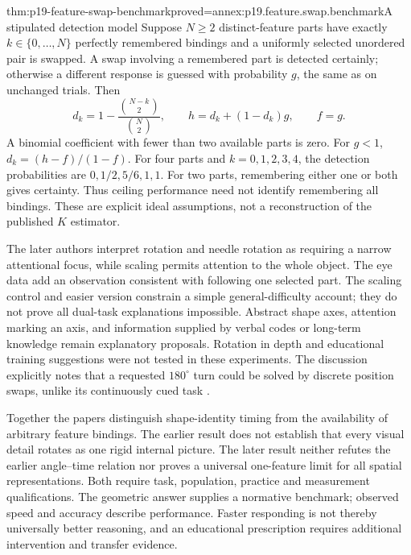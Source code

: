 \begin{hbtheorem}{thm:p19-feature-swap-benchmark}{proved=annex:p19.feature.swap.benchmark}{A stipulated detection model}
Suppose \(N\geq2\) distinct-feature parts have exactly
\(k\in\{0,\ldots,N\}\)
perfectly remembered bindings and a uniformly selected
unordered pair is swapped. A swap involving a remembered
part is detected certainly; otherwise a different response
is guessed with probability \(g\), the same as on unchanged trials.
Then
\[
 d_k=1-\frac{\binom{N-k}{2}}{\binom N2},\qquad
 h=d_k+(1-d_k)g,\qquad f=g.
\]
A binomial coefficient with fewer than two available parts
is zero. For \(g<1\), \(d_k=(h-f)/(1-f)\).
For four parts and \(k=0,1,2,3,4\), the detection probabilities
are \(0,1/2,5/6,1,1\). For two parts, remembering either
one or both gives certainty. Thus ceiling performance need
not identify remembering all bindings.
These are explicit ideal assumptions, not a reconstruction
of the published \(K\) estimator.
\end{hbtheorem}

The later authors interpret rotation and needle rotation as
requiring a narrow attentional focus, while scaling permits
attention to the whole object. The eye data add an observation
consistent with following one selected part. The scaling
control and easier version constrain a simple general-difficulty
account; they do not prove all dual-task explanations impossible.
Abstract shape axes, attention marking an axis, and information
supplied by verbal codes or long-term knowledge remain explanatory
proposals. Rotation in depth and educational training suggestions
were not tested in these experiments. The discussion explicitly
notes that a requested \(180^\circ\) turn could be solved by
discrete position swaps, unlike its continuously cued task
\cite[General Discussion]{XuFranconeri2015FeatureCapacity}.

Together the papers distinguish shape-identity timing from the
availability of arbitrary feature bindings. The earlier result
does not establish that every visual detail rotates as one
rigid internal picture. The later result neither refutes the
earlier angle--time relation nor proves a universal one-feature
limit for all spatial representations. Both require task,
population, practice and measurement qualifications.
The geometric answer supplies a normative benchmark;
observed speed and accuracy describe performance.
Faster responding is not thereby universally better reasoning,
and an educational prescription requires additional intervention
and transfer evidence.
